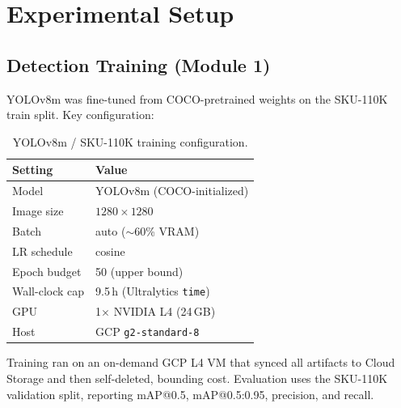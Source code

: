 \section{Experimental Setup}
\subsection{Detection Training (Module 1)}
YOLOv8m was fine-tuned from COCO-pretrained weights on the SKU-110K train split. Key configuration:

\begin{table}[t]
\centering
\caption{YOLOv8m / SKU-110K training configuration.}
\label{tab:train-config}
\begin{tabular}{ll}
\toprule
Setting & Value \\
\midrule
Model            & YOLOv8m (COCO-initialized) \\
Image size       & $1280 \times 1280$ \\
Batch            & auto ($\sim$60\% VRAM) \\
LR schedule      & cosine \\
Epoch budget     & 50 (upper bound) \\
Wall-clock cap   & 9.5\,h (Ultralytics \texttt{time}) \\
GPU              & 1$\times$ NVIDIA L4 (24\,GB) \\
Host             & GCP \texttt{g2-standard-8} \\
\bottomrule
\end{tabular}
\end{table}

Training ran on an on-demand GCP L4 VM that synced all artifacts to Cloud Storage and then
self-deleted, bounding cost. Evaluation uses the SKU-110K validation split, reporting mAP@0.5,
mAP@0.5:0.95, precision, and recall.

